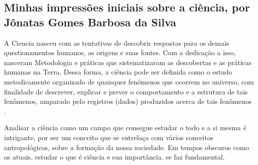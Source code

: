 \subsection{Minhas impressões iniciais sobre a ciência, por Jônatas Gomes Barbosa da Silva}

A \gls{Ciencia} nasceu com as tentativas de descobrir respostas para os demais questionamentos humanos, as origens e suas fontes. Com a dedicação a isso, nasceram \gls{Metodologia} e práticas que sistematizaram as descobertas e as práticas humanas na Terra. Dessa forma, a ciência pode ser definida como o estudo metodicamente organizado de quaisquer fenômenos que ocorrem no universo, com finalidade de descrever, explicar e prever o comportamento e a estrutura de tais fenômenos, amparado pelo registros (dados) produzidos acerca de tais fenômenos \citep{fernandes_ciencia_2018}. 

Analisar a ciência como um campo que consegue estudar o todo e a si mesma é intrigante, por ser um conceito que se entrelaça com vários conceitos antropológicos, sobre a formação da nossa sociedade. Em tempos obscuros como os atuais, estudar o que é ciência e sua importância, se faz fundamental.
